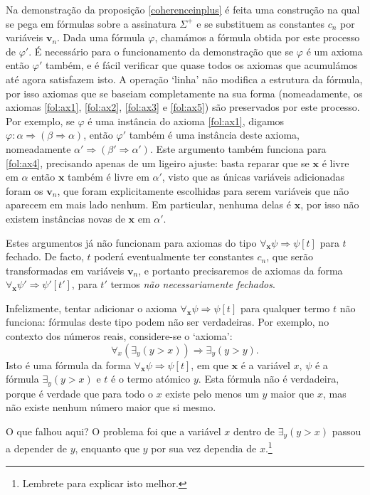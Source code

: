 \documentclass{report}
\theoremstyle{definition}
\theoremstyle{remark}
\renewcommand{\bf}[1]{\mathbf{#1}}
\newcommand{\imply}{\mathbin{\Rightarrow}}
\begin{document}
	Na demonstração da proposição \ref{coherenceinplus} é feita uma construção na qual se pega em fórmulas sobre a assinatura $\Sigma^+$ e se substituem as constantes $c_n$ por variáveis $\bf v_n$. Dada uma fórmula $\varphi$, chamámos a fórmula obtida por este processo de $\varphi'$. É necessário para o funcionamento da demonstração que se $\varphi$ é um axioma então $\varphi'$ também, e é fácil verificar que quase todos os axiomas que acumulámos até agora satisfazem isto. A operação `linha' não modifica a estrutura da fórmula, por isso axiomas que se baseiam completamente na sua forma (nomeadamente, os axiomas \eqref{fol:ax1}, \eqref{fol:ax2}, \eqref{fol:ax3} e \eqref{fol:ax5}) são preservados por este processo. Por exemplo, se $\varphi$ é uma instância do axioma \eqref{fol:ax1}, digamos $\varphi : \alpha \imply (\beta \imply \alpha)$, então $\varphi'$ também é uma instância deste axioma, nomeadamente $\alpha' \imply (\beta' \imply \alpha')$. Este argumento também funciona para \eqref{fol:ax4}, precisando apenas de um ligeiro ajuste: basta reparar que se $\bf x$ é livre em $\alpha$ então $\bf x$ também é livre em $\alpha'$, visto que as únicas variáveis adicionadas foram os $\bf v_n$, que foram explicitamente escolhidas para serem variáveis que não aparecem em mais lado nenhum. Em particular, nenhuma delas é $\bf x$, por isso não existem instâncias novas de $\bf x$ em $\alpha'$.

	Estes argumentos já não funcionam para axiomas do tipo $\forall_{\bf x} \psi \imply \psi[t]$ para $t$ fechado. De facto, $t$ poderá eventualmente ter constantes $c_n$, que serão transformadas em variáveis $\bf v_n$, e portanto precisaremos de axiomas da forma $\forall_{\bf x} \psi' \imply \psi'[t']$, para $t'$ termos \emph{não necessariamente fechados}.

	Infelizmente, tentar adicionar o axioma $\forall_{\bf x} \psi \imply \psi[t]$ para qualquer termo $t$ não funciona: fórmulas deste tipo podem não ser verdadeiras. Por exemplo, no contexto dos números reais, considere-se o `axioma':
\[\forall_x (\exists_y (y>x)) \imply \exists_y (y > y).\]
Isto é uma fórmula da forma $\forall_{\bf x} \psi \imply \psi[t]$, em que $\bf x$ é a variável $x$, $\psi$ é a fórmula $\exists_y (y>x)$ e $t$ é o termo atómico $y$. Esta fórmula não é verdadeira, porque é verdade que para todo o $x$ existe pelo menos um $y$ maior que $x$, mas não existe nenhum número maior que si mesmo.

O que falhou aqui? O problema foi que a variável $x$ dentro de $\exists_y (y>x)$ passou a depender de $y$, enquanto que $y$ por sua vez dependia de $x$.\footnote{Lembrete para explicar isto melhor.}
\end{document}
